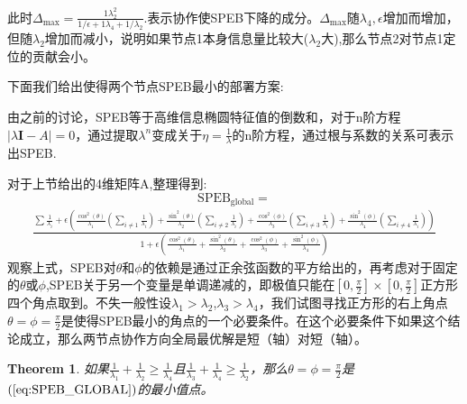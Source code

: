\documentclass[12pt]{article}
\newtheorem{thm}{Theorem}[section]
\theoremstyle{remark}
\begin{document}
此时$\Delta_{\text{max}}=\frac{1\lambda_2^2}{1/\epsilon+1\lambda_4+1/\lambda_2}$.表示协作使SPEB下降的成分。$\Delta_{\text{max}}$随$\lambda_4,\epsilon$增加而增加，但随$\lambda_2$增加而减小，说明如果节点1本身信息量比较大($\lambda_2$大),那么节点2对节点1定位的贡献会小。

下面我们给出使得两个节点SPEB最小的部署方案:

由之前的讨论，SPEB等于高维信息椭圆特征值的倒数和，对于n阶方程$|\lambda \bm{I}-A|=0$，通过提取$\lambda^n$变成关于$\eta=\frac{1}{\lambda}$的n阶方程，通过根与系数的关系可表示出SPEB.

对于上节给出的4维矩阵A,整理得到:
\[
\text{SPEB}_{\text{global}}=
\]
\begin{equation}\label{eq:SPEB_GLOBAL}
\begin{split}
\frac{\displaystyle\sum \frac{1}{\lambda_i}+\epsilon(\frac{\cos^2(\theta)}{\lambda_1}(\sum_{i \neq 1}\frac{1}{\lambda_i})+\frac{\sin^2(\theta)}{\lambda_2}(\displaystyle\sum_{i \neq 2}\frac{1}{\lambda_i})+\frac{\cos^2(\phi)}{\lambda_3}(\sum_{i \neq 3}\frac{1}{\lambda_i})+\frac{\sin^2(\phi)}{\lambda_4}(\sum_{i \neq 4}\frac{1}{\lambda_i}))}{\displaystyle 1+\epsilon(\frac{\cos^2(\theta)}{\lambda_1}+\frac{\sin^2(\theta)}{\lambda_2}+\frac{\cos^2(\phi)}{\lambda_3}+\frac{\sin^2(\phi)}{\lambda_4})}
\end{split}
\end{equation}
观察上式，SPEB对$\theta$和$\phi$的依赖是通过正余弦函数的平方给出的，再考虑对于固定的$\theta$或$\phi$,SPEB关于另一个变量是单调递减的，即极值只能在$[0,\frac{\pi}{2}]\times[0,\frac{\pi}{2}]$正方形四个角点取到。不失一般性设$\lambda_1>\lambda_2$,$\lambda_3>\lambda_4$，我们试图寻找正方形的右上角点$\theta=\phi=\frac{\pi}{2}$是使得SPEB最小的角点的一个必要条件。在这个必要条件下如果这个结论成立，那么两节点协作方向全局最优解是短（轴）对短（轴）。
\begin{thm}
如果$\frac{1}{\lambda_1}+\frac{1}{\lambda_2}\geq\frac{1}{\lambda_4}$且$\frac{1}{\lambda_3}+\frac{1}{\lambda_4}\geq\frac{1}{\lambda_2}$，那么$\theta=\phi=\frac{\pi}{2}$是$(\ref{eq:SPEB_GLOBAL})$的最小值点。
\end{thm}
\end{document}

